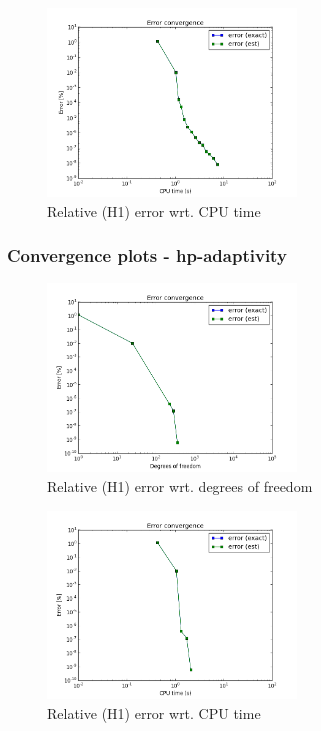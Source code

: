 			\begin{figure}[H]
				\centering
				\includegraphics[height=5cm]{img/sin-h3-cpu.png}
				\caption{Relative (H1) error wrt. CPU time}
			\end{figure}
			
		\subsubsection{Convergence plots - hp-adaptivity}
			\begin{figure}[H]
				\centering
				\includegraphics[height=5cm]{img/sin-hp-dof.png}
				\caption{Relative (H1) error wrt. degrees of freedom}
			\end{figure}
			
			\begin{figure}[H]
				\centering
				\includegraphics[height=5cm]{img/sin-hp-cpu.png}
				\caption{Relative (H1) error wrt. CPU time}
			\end{figure}



